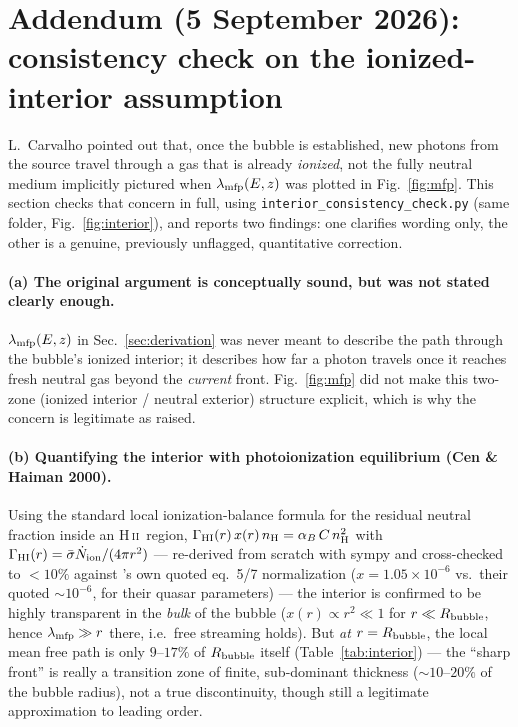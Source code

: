 \documentclass[11pt,a4paper]{article}
\newcommand{\Ndot}{\dot{N}_{\rm ion}}
\newcommand{\nH}{n_{\rm H}}
\newcommand{\HII}{\ion{H}{ii}}
\newcommand{\ion}[2]{\textrm{#1\,\textsc{#2}}}
\newcommand{\lmfp}{\lambda_{\rm mfp}}
\begin{document}
\section*{Addendum (5 September 2026): consistency check on the ionized-interior assumption}
\label{sec:addendum}

L.\ Carvalho pointed out that, once the bubble is established, new photons from the source travel through a
gas that is already \emph{ionized}, not the fully neutral medium implicitly pictured when
$\lmfp(E,z)$ was plotted in Fig.~\ref{fig:mfp}. This section checks that concern in full, using
\texttt{interior\_consistency\_check.py} (same folder, Fig.~\ref{fig:interior}), and reports two findings:
one clarifies wording only, the other is a genuine, previously unflagged, quantitative correction.

\paragraph{(a) The original argument is conceptually sound, but was not stated clearly enough.}
$\lmfp(E,z)$ in Sec.~\ref{sec:derivation} was never meant to describe the path through the bubble's ionized
interior; it describes how far a photon travels once it reaches fresh neutral gas beyond the \emph{current}
front. Fig.~\ref{fig:mfp} did not make this two-zone (ionized interior / neutral exterior) structure
explicit, which is why the concern is legitimate as raised.

\paragraph{(b) Quantifying the interior with photoionization equilibrium (Cen \& Haiman 2000).}
Using the standard local ionization-balance formula for the residual neutral fraction inside an \HII\
region, $\Gamma_{\rm HI}(r)\,x(r)\,\nH = \alpha_B\,C\,\nH^2$ with $\Gamma_{\rm HI}(r)=\bar\sigma\Ndot/(4\pi
r^2)$ --- re-derived from scratch with sympy and cross-checked to $<10\%$ against \citet{Cen2000}'s own
quoted eq.~5/7 normalization ($x=1.05\times10^{-6}$ vs.\ their quoted $\sim10^{-6}$, for their quasar
parameters) --- the interior is confirmed to be highly transparent in the \emph{bulk} of the bubble
($x(r)\propto r^2\ll1$ for $r\ll R_{\rm bubble}$, hence $\lmfp\gg r$ there, i.e.\ free streaming holds). But
\emph{at} $r=R_{\rm bubble}$, the local mean free path is only $9$--$17\%$ of $R_{\rm bubble}$ itself
(Table~\ref{tab:interior}) --- the ``sharp front'' is really a transition zone of finite, sub-dominant
thickness ($\sim10$--$20\%$ of the bubble radius), not a true discontinuity, though still a legitimate
approximation to leading order.
\end{document}
